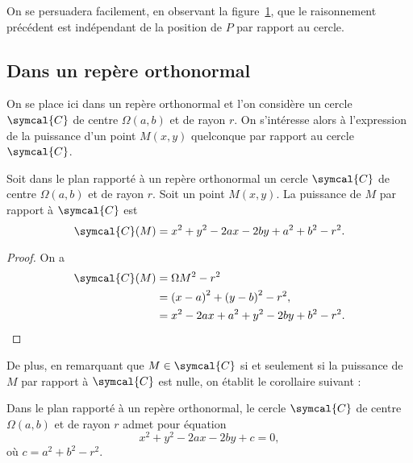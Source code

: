 \begin{remark}
On se persuadera facilement, en observant la figure \ref{figpscal3}, que le raisonnement précédent est indépendant de la position de $P$ par rapport au cercle.
\end{remark}

\begin{figure}[ht]
\centering
{}
\figcaption{}\label{figpscal3}
\end{figure}

\subsection{Dans un repère orthonormal}
On se place ici dans un repère orthonormal et l'on considère un cercle $\symcal{C}$ de centre $\Omega(a,b)$ et de rayon $r$. On s'intéresse alors à l'expression de la puissance d'un point $M(x,y)$ quelconque par rapport au cercle $\symcal{C}$.
\begin{thm}\label{threp}
Soit dans le plan rapporté à un repère orthonormal un cercle $\symcal{C}$ de centre $\Omega(a,b)$ et de rayon $r$. Soit un point $M(x,y)$. La puissance de $M$ par rapport à $\symcal{C}$ est 
\[\symcal{C}(M) = x^2+y^2-2ax-2by+a^2+b^2-r^2.\]
\end{thm}

\begin{proof}
On a 
\begin{align*}\symcal{C}(M)&=\Omega M^2-r^2\\
&={(x-a)}^2+{(y-b)}^2-r^2,\\
&=x^2-2ax+a^2+y^2-2by+b^2-r^2.\qedhere
\end{align*}
\end{proof}

De plus, en remarquant que $M\in\symcal{C}$ si et seulement si la puissance de $M$ par rapport à $\symcal{C}$ est nulle, on établit le corollaire suivant :
\begin{coro*}
Dans le plan rapporté à un repère orthonormal, le cercle $\symcal{C}$ de centre $\Omega(a,b)$ et de rayon $r$ admet pour équation
\[x^2+y^2-2ax-2by+c=0,\]
où $c=a^2+b^2-r^2$.
\end{coro*}

